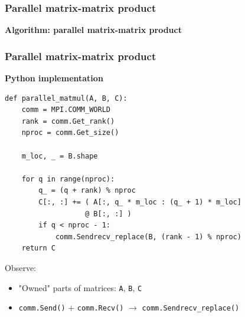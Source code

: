 \documentclass{beamer}
\begin{document}

\begin{frame}
  \frametitle{Parallel matrix-matrix product}
  \textbf{Algorithm: parallel matrix-matrix product}
  \begin{algorithmic}[1]
  \EndIf
  \EndFor
  \EndFor
  \end{algorithmic}
\end{frame}


\begin{frame}[fragile]
  \frametitle{Parallel matrix-matrix product}
  \textbf{Python implementation}
  \begin{lstlisting}
def parallel_matmul(A, B, C):
    comm = MPI.COMM_WORLD
    rank = comm.Get_rank()
    nproc = comm.Get_size()

    m_loc, _ = B.shape

    for q in range(nproc):
        q_ = (q + rank) % nproc
        C[:, :] += ( A[:, q_ * m_loc : (q_ + 1) * m_loc]
                   @ B[:, :] )
        if q < nproc - 1:
            comm.Sendrecv_replace(B, (rank - 1) % nproc)
    return C
  \end{lstlisting}
  Observe:
  \begin{itemize}
    \item "Owned" parts of matrices: \lstinline{A}, \lstinline{B}, \lstinline{C}
    \item \lstinline{comm.Send()} + \lstinline{comm.Recv()} $\rightarrow$ \lstinline{comm.Sendrecv_replace()}
  \end{itemize}
\end{frame}

\end{document}
